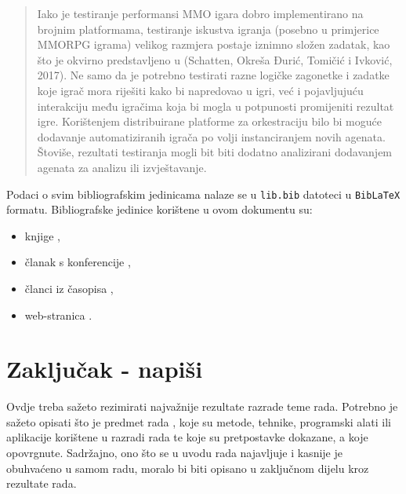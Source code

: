 \documentclass[]{foi}
\begin{document}
\blockquote[{\cite[str. 6]{schatten2020PlatformeZaOrkestraciju}}]{Iako je testiranje performansi MMO igara dobro implementirano na brojnim platformama, testiranje iskustva
igranja (posebno u primjerice MMORPG igrama) velikog razmjera postaje iznimno složen zadatak, kao što
je okvirno predstavljeno u (Schatten, Okreša Ðurić, Tomičić i Ivković, 2017). Ne samo da je potrebno testirati
razne logičke zagonetke i zadatke koje igrač mora riješiti kako bi napredovao u igri, već i pojavljujuću interakciju među igračima koja bi mogla u potpunosti promijeniti rezultat igre. Korištenjem distribuirane platforme za orkestraciju bilo bi moguće dodavanje automatiziranih igrača po volji instanciranjem novih agenata. Štoviše, rezultati testiranja mogli bit biti dodatno
analizirani dodavanjem agenata za analizu ili izvještavanje.}

Podaci o svim bibliografskim jedinicama nalaze se u \texttt{lib.bib} datoteci u \texttt{BibLaTeX} formatu. Bibliografske jedinice korištene u ovom dokumentu su:
\begin{itemize}
    \item knjige \cite{russell2022ArtificialIntelligenceModern,wooldridge2009IntroductionMultiAgentSystems,oraictolic2011AkademskoPismoStrategije},
    \item članak s konferencije \cite{okresaduric2019ModellingFormingTemporary},
    \item članci iz časopisa \cite{SchattenEtAl2016roadmap,rincon2017InfluencingPeopleSocial},
    \item web-stranica \cite{copeland2020ArtificialIntelligence}.
\end{itemize}






\chapter{Zaključak - napiši}

Ovdje treba sažeto rezimirati najvažnije rezultate razrade teme rada. Potrebno je sažeto opisati što je predmet rada \cite{copeland2020ArtificialIntelligence}, koje su metode, tehnike, programski alati ili aplikacije korištene u razradi rada te koje su pretpostavke dokazane, a koje opovrgnute. Sadržajno, ono što se u uvodu rada najavljuje i kasnije je obuhvaćeno u samom radu, moralo bi biti opisano u zaključnom dijelu kroz rezultate rada. 


\makebackmatter
\end{document}
